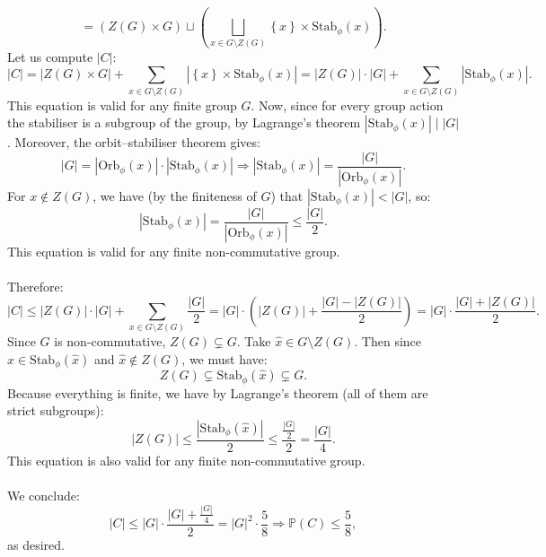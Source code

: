 \documentclass[11pt, a4paper, oneside]{article}
\theoremstyle{remark}
\theoremstyle{lemma}
\begin{document}
\[
= \left(Z(G)\times G\right) \sqcup \left( \bigsqcup_{x\in G \setminus Z(G)} \left\{ x \right\} \times \mathrm{Stab}_{\phi}(x) \right).
\]
Let us compute \(|C|\):
\begin{equation}
\label{1.1}
\tag{*}
|C| = |Z(G)\times G| + \sum_{x\in G \setminus Z(G)} |\left\{ x \right\} \times \mathrm{Stab}_{\phi}(x)| = |Z(G)|\cdot |G| + \sum_{x\in G \setminus Z(G)} |\mathrm{Stab}_{\phi}(x)|.
\end{equation}
This equation is valid for any finite group \(G\).  
Now, since for every group action the stabiliser is a subgroup of the group, by Lagrange's theorem \(|\mathrm{Stab}_{\phi}(x)| \mid |G|\). Moreover, the orbit–stabiliser theorem gives:
\[
|G| = \left|\mathrm{Orb}_{\phi}(x)\right| \cdot \left|\mathrm{Stab}_{\phi}(x)\right| \Rightarrow \left|\mathrm{Stab}_{\phi}(x)\right| = \frac{|G|}{\left|\mathrm{Orb}_{\phi}(x)\right|}.
\]
For \(x\notin Z(G)\), we have (by the finiteness of \(G\)) that \(\left|\mathrm{Stab}_{\phi}(x)\right| < |G|\), so:
\begin{equation}
\label{1.2}
\tag{1}
\left|\mathrm{Stab}_{\phi}(x)\right| = \frac{|G|}{\left|\mathrm{Orb}_{\phi}(x)\right|} \leq\frac{|G|}{2}.
\end{equation}
This equation is valid for any finite non-commutative group.
\\\\
Therefore:
\[
|C| \leq |Z(G)|\cdot |G| + \sum_{x\in G \setminus Z(G)} \frac{|G|}{2} = |G|\cdot\left( |Z(G)| + \frac{|G| - |Z(G)|}{2} \right) = |G|\cdot \frac{|G| + |Z(G)|}{2}.
\]
Since \(G\) is non-commutative, \(Z(G)\subsetneq G\). Take \(\hat{x} \in G \setminus Z(G)\). Then since \(\hat{x} \in \mathrm{Stab}_{\phi}(\hat{x})\) and \(\hat{x} \notin Z(G)\), we must have:
\[
Z(G)\subsetneq \mathrm{Stab}_{\phi}(\hat{x}) \subsetneq G.
\]
Because everything is finite, we have by Lagrange’s theorem (all of them are strict subgroups):
\begin{equation}
\label{1.3}
\tag{2}
|Z(G)| \leq \frac{|\mathrm{Stab}_{\phi}(\hat{x})|}{2} \leq \frac{\frac{|G|}{2}}{2} = \frac{|G|}{4}.
\end{equation}
This equation is also valid for any finite non-commutative group.
\\\\
We conclude:
\[
|C| \leq |G|\cdot\frac{|G| + \frac{|G|}{4}}{2} = |G|^2 \cdot \frac{5}{8} \Rightarrow \mathbb{P}(C) \leq \frac{5}{8},
\]
as desired.
\\\\
\end{document}
